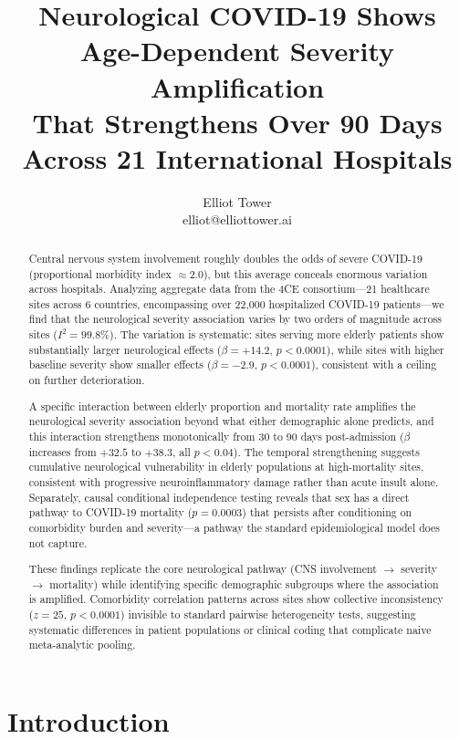 \documentclass{article}
\title{Neurological COVID-19 Shows Age-Dependent Severity Amplification\\That Strengthens Over 90 Days Across 21 International Hospitals}
\author{\name Elliot Tower \\
      \email elliot@elliottower.ai}
\begin{document}
\maketitle

\begin{abstract}
Central nervous system involvement roughly doubles the odds of severe COVID-19 (proportional morbidity index $\approx 2.0$), but this average conceals enormous variation across hospitals. Analyzing aggregate data from the 4CE consortium---21 healthcare sites across 6 countries, encompassing over 22,000 hospitalized COVID-19 patients---we find that the neurological severity association varies by two orders of magnitude across sites ($I^2 = 99.8\%$). The variation is systematic: sites serving more elderly patients show substantially larger neurological effects ($\beta = +14.2$, $p < 0.0001$), while sites with higher baseline severity show smaller effects ($\beta = -2.9$, $p < 0.0001$), consistent with a ceiling on further deterioration.

A specific interaction between elderly proportion and mortality rate amplifies the neurological severity association beyond what either demographic alone predicts, and this interaction strengthens monotonically from 30 to 90 days post-admission ($\beta$ increases from $+32.5$ to $+38.3$, all $p < 0.04$). The temporal strengthening suggests cumulative neurological vulnerability in elderly populations at high-mortality sites, consistent with progressive neuroinflammatory damage rather than acute insult alone. Separately, causal conditional independence testing reveals that sex has a direct pathway to COVID-19 mortality ($p = 0.0003$) that persists after conditioning on comorbidity burden and severity---a pathway the standard epidemiological model does not capture.

These findings replicate the core neurological pathway (CNS involvement $\to$ severity $\to$ mortality) while identifying specific demographic subgroups where the association is amplified. Comorbidity correlation patterns across sites show collective inconsistency ($z = 25$, $p < 0.0001$) invisible to standard pairwise heterogeneity tests, suggesting systematic differences in patient populations or clinical coding that complicate naive meta-analytic pooling.
\end{abstract}


\section{Introduction}
\end{document}
